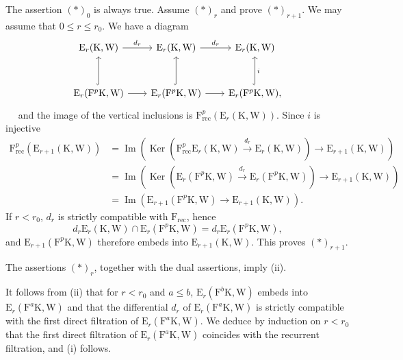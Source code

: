 \documentclass[11pt,leqno]{article}
\newcommand{\Page}[1]{\ifvmode\noindent\else\unskip\ \fi{\footnotesize\textcolor{gray}{[p.\,#1]}}\ \ignorespaces}
\begin{document}
The assertion \((\ast)_0\) is always true. Assume \((\ast)_r\) and prove \((\ast)_{r+1}\). We may assume that \(0\leq r\leq r_0\). We have a diagram
\[
\begin{tikzcd}[column sep=2em,row sep=3em]
\mathrm{E}_r(\mathrm{K},\mathrm{W}) \arrow[r,"d_r"]
& \mathrm{E}_r(\mathrm{K},\mathrm{W}) \arrow[r,"d_r"]
& \mathrm{E}_r(\mathrm{K},\mathrm{W}) \\
\mathrm{E}_r(\mathrm{F}^p\mathrm{K},\mathrm{W}) \arrow[u,hook] \arrow[r]
& \mathrm{E}_r(\mathrm{F}^p\mathrm{K},\mathrm{W}) \arrow[u,hook] \arrow[r]
& \mathrm{E}_r(\mathrm{F}^p\mathrm{K},\mathrm{W}), \arrow[u,hook,"i"']
\end{tikzcd}
\]
\Page{27}
and the image of the vertical inclusions is \(\mathrm{F}_{\mathrm{rec}}^p(\mathrm{E}_r(\mathrm{K},\mathrm{W}))\). Since \(i\) is injective
\begin{align*}
\mathrm{F}_{\mathrm{rec}}^p(\mathrm{E}_{r+1}(\mathrm{K},\mathrm{W}))
&=\operatorname{Im}(\operatorname{Ker}(
\mathrm{F}_{\mathrm{rec}}^p\mathrm{E}_r(\mathrm{K},\mathrm{W})
\xrightarrow{d_r}\mathrm{E}_r(\mathrm{K},\mathrm{W}))
\to\mathrm{E}_{r+1}(\mathrm{K},\mathrm{W}))\\
&=\operatorname{Im}(\operatorname{Ker}(
\mathrm{E}_r(\mathrm{F}^p\mathrm{K},\mathrm{W})
\xrightarrow{d_r}\mathrm{E}_r(\mathrm{F}^p\mathrm{K},\mathrm{W}))
\to\mathrm{E}_{r+1}(\mathrm{K},\mathrm{W}))\\
&=\operatorname{Im}(
\mathrm{E}_{r+1}(\mathrm{F}^p\mathrm{K},\mathrm{W})
\to\mathrm{E}_{r+1}(\mathrm{K},\mathrm{W})).
\end{align*}
If \(r<r_0\), \(d_r\) is strictly compatible with \(\mathrm{F}_{\mathrm{rec}}\), hence
\[
d_r\mathrm{E}_r(\mathrm{K},\mathrm{W})
\cap\mathrm{E}_r(\mathrm{F}^p\mathrm{K},\mathrm{W})
=d_r\mathrm{E}_r(\mathrm{F}^p\mathrm{K},\mathrm{W}),
\]
and \(\mathrm{E}_{r+1}(\mathrm{F}^p\mathrm{K},\mathrm{W})\) therefore embeds into \(\mathrm{E}_{r+1}(\mathrm{K},\mathrm{W})\). This proves \((\ast)_{r+1}\).

The assertions \((\ast)_r\), together with the dual assertions, imply (ii).

It follows from (ii) that for \(r<r_0\) and \(a\leq b\), \(\mathrm{E}_r(\mathrm{F}^b\mathrm{K},\mathrm{W})\) embeds into \(\mathrm{E}_r(\mathrm{F}^a\mathrm{K},\mathrm{W})\) and that the differential \(d_r\) of \(\mathrm{E}_r(\mathrm{F}^a\mathrm{K},\mathrm{W})\) is strictly compatible with the first direct filtration of \(\mathrm{E}_r(\mathrm{F}^a\mathrm{K},\mathrm{W})\). We deduce by induction on \(r<r_0\) that the first direct filtration of \(\mathrm{E}_r(\mathrm{F}^a\mathrm{K},\mathrm{W})\) coincides with the recurrent filtration, and (i) follows.
\end{document}
